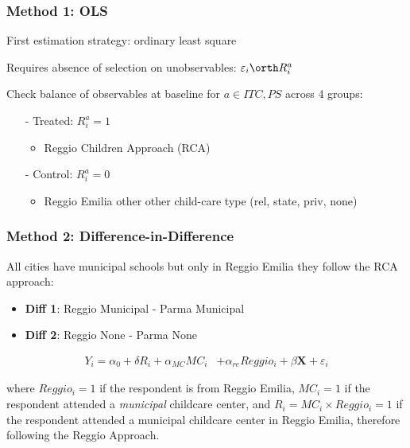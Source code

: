 \begin{frame}
\frametitle{Method 1: OLS}\label{frame:OLS}
First estimation strategy: ordinary least square 

\vspace{3ex}

Requires absence of selection on unobservables: $\varepsilon_{i} \orth R^{a}_{i}$

\vspace{1ex}
Check balance of observables at baseline for $a \in ITC, PS$ across 4 groups:
\begin{itemize}
	\item[-] Treated: $R^{a}_{i}=1$
	\begin{itemize}
		\item Reggio Children Approach (RCA) 
	\end{itemize}
	\item[-] Control: $R^{a}_{i}=0$
	\begin{itemize} \setcounter{enumi}{1}
		\item Reggio Emilia other \hfill {\scriptsize other child-care type (rel, state, priv, none)}
	\end{itemize}
\end{itemize}
\end{frame}
\begin{frame} \frametitle{Method 2: Difference-in-Difference} \label{frame:DiD-model}
All cities have municipal schools but only in Reggio Emilia they follow the RCA approach:
\begin{itemize}
	\item \textbf{Diff 1}: Reggio Municipal - Parma Municipal
	\item \textbf{Diff 2}: Reggio None - Parma None
\end{itemize}

\begin{align}
Y_{i} = \alpha_0+ \delta R_{i} + \alpha_{MC} MC_{i} & +  \alpha_{re} Reggio_{i} + \beta \boldsymbol{X} + \varepsilon_{i} \nonumber  \label{eq8:didpr}
\end{align} 

where $Reggio_{i}=1$ if the respondent is from Reggio Emilia, $MC_{i}=1$ if the respondent attended a \textit{municipal} childcare center, and $R_{i}=MC_{i} \times Reggio_{i}=1$ if the respondent attended a municipal childcare center in Reggio Emilia, therefore following the Reggio Approach.

\end{frame}


